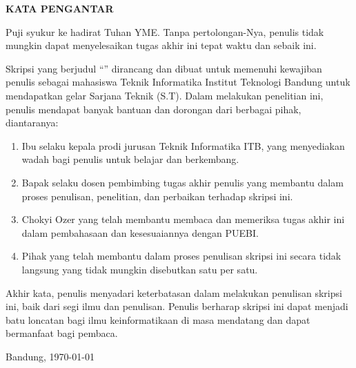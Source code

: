 \clearpage

\begin{center}
 \textbf{\large KATA PENGANTAR}\\[3em]
\end{center}

Puji syukur ke hadirat Tuhan YME.\@
Tanpa pertolongan-Nya, penulis tidak mungkin dapat menyelesaikan tugas akhir ini tepat waktu dan sebaik ini.

Skripsi yang berjudul ``\textit{\thesistitle}'' dirancang dan dibuat untuk memenuhi kewajiban penulis sebagai mahasiswa Teknik Informatika Institut Teknologi Bandung untuk mendapatkan gelar Sarjana Teknik (S.T).
Dalam melakukan penelitian ini, penulis mendapat banyak bantuan dan dorongan dari berbagai pihak, diantaranya:
\begin{enumerate}
  \item Ibu \dean{} selaku kepala prodi jurusan Teknik Informatika ITB, yang menyediakan wadah bagi penulis untuk belajar dan berkembang.
  \item Bapak \supervisor{} selaku dosen pembimbing tugas akhir penulis yang membantu dalam proses penulisan, penelitian, dan perbaikan terhadap skripsi ini.
  \item Chokyi Ozer yang telah membantu membaca dan memeriksa tugas akhir ini dalam pembahasaan dan kesesuaiannya dengan PUEBI.\@ 
  \item Pihak yang telah membantu dalam proses penulisan skripsi ini secara tidak langsung yang tidak mungkin disebutkan satu per satu. 
\end{enumerate}

Akhir kata, penulis menyadari keterbatasan dalam melakukan penulisan skripsi ini, baik dari segi ilmu dan penulisan.
Penulis berharap skripsi ini dapat menjadi batu loncatan bagi ilmu keinformatikaan di masa mendatang dan dapat bermanfaat bagi pembaca.

Bandung, \today

\theauthor{}


